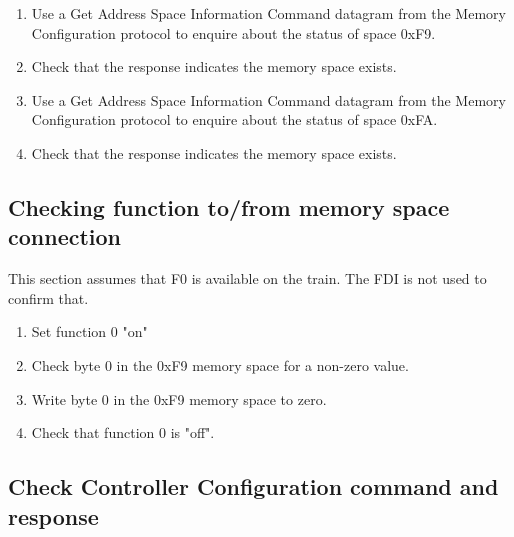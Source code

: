 \begin{enumerate}

\item Use a Get Address Space Information Command datagram from the Memory Configuration protocol
to enquire about the status of space 0xF9.

\item Check that the response indicates the memory space exists.

\item Use a Get Address Space Information Command datagram from the Memory Configuration protocol
to enquire about the status of space 0xFA.

\item Check that the response indicates the memory space exists.

\end{enumerate}
    
\subsection{Checking function to/from memory space connection}

This section assumes that F0 is available on the train.
The FDI is not used to confirm that.

\begin{enumerate}

    \item Set function 0 "on"

    \item Check byte 0 in the 0xF9 memory space for a non-zero value.

    \item Write byte 0 in the 0xF9 memory space to zero.

    \item Check that function 0 is "off".

\end{enumerate}


\subsection{Check Controller Configuration command and response}

